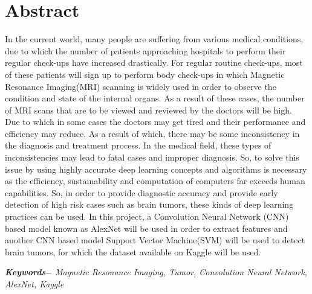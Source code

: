 

\setcounter{tocdepth}{3}
\setcounter{secnumdepth}{3}


\KECcoverpage  
\KECtitlepage
{} %



\chapter*{Abstract} %
In the current world, many people are suffering from various medical conditions, due to which the number of patients approaching hospitals to perform their regular check-ups have increased drastically. For regular routine check-ups, most of these patients will sign up to perform body check-ups in which Magnetic Resonance Imaging(MRI) scanning is widely used in order to observe the condition and state of the internal organs. As a result of these cases, the number of MRI scans that are to be viewed and reviewed by the doctors will be high. Due to which in some cases the doctors may get tired and their performance and efficiency may reduce. As a result of which, there may be some inconsistency in the diagnosis and treatment process. In the medical field, these types of inconsistencies may lead to fatal cases and improper diagnosis. So, to solve this issue by using highly accurate deep learning concepts and algorithms is necessary as the efficiency, sustainability and computation of computers far exceeds human capabilities. So, in order to provide diagnostic accuracy and provide early detection of high risk cases such as brain tumors, these kinds of deep learning practices can be used. In this project, a Convolution Neural Network (CNN) based model known as AlexNet will be used in order to extract features and another CNN based model Support Vector Machine(SVM) will be used to detect brain tumors, for which the dataset available on Kaggle  will be used.
\par
\textbf{\textit{Keywords$-$}} \emph{Magnetic Resonance Imaging, Tumor, Convolution Neural Network, AlexNet, Kaggle
}

